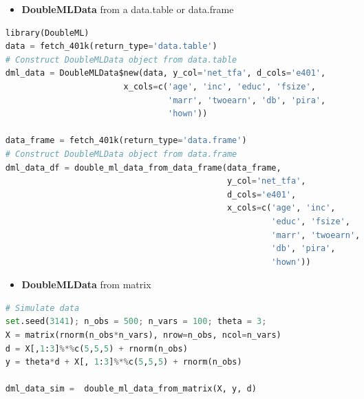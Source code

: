 \begin{frame}[fragile]
\begin{columns}
\begin{column}{0.3\textwidth}
\end{column}
\begin{column}{0.7\textwidth}
\begin{itemize}
\item \textbf{DoubleMLData} from a data.table or data.frame
\end{itemize}
{\tiny
\begin{lstlisting}[language=Python,
backgroundcolor = \color{gray!20},
keywordstyle=\color{OliveGreen}, stringstyle=\color{BrickRed}]
library(DoubleML)
data = fetch_401k(return_type='data.table')
# Construct DoubleMLData object from data.table
dml_data = DoubleMLData$new(data, y_col='net_tfa', d_cols='e401',
	                    x_cols=c('age', 'inc', 'educ', 'fsize',
	                             'marr', 'twoearn', 'db', 'pira',
	                             'hown'))
	                        		 
data_frame = fetch_401k(return_type='data.frame')
# Construct DoubleMLData object from data.frame
dml_data_df = double_ml_data_from_data_frame(data_frame,
                                             y_col='net_tfa',
                                             d_cols='e401', 
                                             x_cols=c('age', 'inc',
                                                      'educ', 'fsize',
                                                      'marr', 'twoearn',
                                                      'db', 'pira',
                                                      'hown'))
\end{lstlisting}
}
\begin{itemize}
\item \textbf{DoubleMLData} from matrix
\end{itemize}
{\tiny
\begin{lstlisting}[language=Python,
backgroundcolor = \color{gray!20},
keywordstyle=\color{OliveGreen}, stringstyle=\color{BrickRed}]
# Simulate data
set.seed(3141); n_obs = 500; n_vars = 100; theta = 3; 
X = matrix(rnorm(n_obs*n_vars), nrow=n_obs, ncol=n_vars)
d = X[,1:3]%*%c(5,5,5) + rnorm(n_obs)
y = theta*d + X[, 1:3]%*%c(5,5,5) + rnorm(n_obs)

dml_data_sim =  double_ml_data_from_matrix(X, y, d)
\end{lstlisting}
}
\end{column}
\end{columns}
\end{frame}

